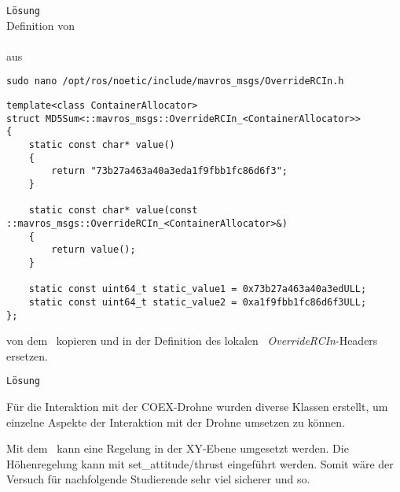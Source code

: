 \texttt{Lösung}\\
Definition von \\ \\aus 

\begin{lstlisting}[style=Style_Bash, caption=Befehl zum Öffnen des \textit{OverrideRCIn}-Headers]
sudo nano /opt/ros/noetic/include/mavros_msgs/OverrideRCIn.h
\end{lstlisting}

\begin{lstlisting}[style=Style_CPP, numbers=none, caption=Definition des Struct \CodeStruct{MD5Sum} für das Template \textit{OverrideRCIn}]
template<class ContainerAllocator>
struct MD5Sum<::mavros_msgs::OverrideRCIn_<ContainerAllocator>>
{
	static const char* value()
	{
		return "73b27a463a40a3eda1f9fbb1fc86d6f3";
	}

	static const char* value(const ::mavros_msgs::OverrideRCIn_<ContainerAllocator>&)
	{
		return value();
	}
	
	static const uint64_t static_value1 = 0x73b27a463a40a3edULL;
	static const uint64_t static_value2 = 0xa1f9fbb1fc86d6f3ULL;
};
\end{lstlisting}

von dem \Pie\ kopieren und in der Definition des lokalen \ROS\ \textit{\mbox{OverrideRCIn}}-Headers ersetzen.








\texttt{Lösung}\\























Für die Interaktion mit der COEX-Drohne wurden diverse Klassen erstellt, um einzelne Aspekte der Interaktion mit der Drohne umsetzen zu können.






Mit dem  \missing\ kann eine Regelung in der XY-Ebene umgesetzt werden. Die Höhenregelung kann mit set\_attitude/thrust eingeführt werden.
Somit wäre der Versuch für nachfolgende Studierende sehr viel sicherer und so.


